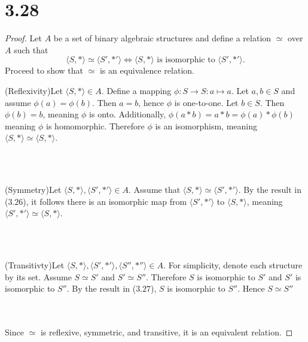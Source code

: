 \documentclass[12pt]{extarticle}
\begin{document}
\section*{3.28}
\begin{proof}
	Let $A$ be a set of binary algebraic structures and define a relation $\simeq$ over $A$ such that
	\[
		\langle S, * \rangle \simeq \langle S', *' \rangle \Longleftrightarrow \langle S, * \rangle\text{ is isomorphic to }\langle S', *' \rangle
	.\]
	Proceed to show that $\simeq$ is an equivalence relation.
	\\

	\qquad\begin{minipage}{\dimexpr\textwidth-2cm}
		(Reflexivity)\quad Let $\langle S, * \rangle \in A$. Define a mapping $\phi : S \to S : a \mapsto a$. Let $a,b \in S$ and assume $\phi(a) = \phi(b)$. Then $a = b$, hence $\phi$ is one-to-one. Let $b \in S$. Then $\phi(b) = b$, meaning $\phi$ is onto. Additionally, $\phi(a * b) = a*b = \phi(a) * \phi(b)$ meaning $\phi$ is homomorphic. Therefore $\phi$ is an isomorphism, meaning $\langle S, * \rangle \simeq \langle S, * \rangle$.
	\end{minipage} \\
  \\

	\qquad\begin{minipage}{\dimexpr\textwidth-2cm}
		(Symmetry)\quad Let $\langle S, * \rangle, \langle S', *' \rangle \in A$. Assume that $\langle S, * \rangle \simeq \langle S', *' \rangle$. By the result in ($3.26$), it follows there is an isomorphic map from $\langle S', *' \rangle$ to $\langle S, * \rangle$, meaning $\langle S', *' \rangle \simeq \langle S, * \rangle$.
	\end{minipage} \\
	\\

	\qquad\begin{minipage}{\dimexpr\textwidth-2cm}
		(Transitivty)\quad Let $\langle S, * \rangle, \langle S', *' \rangle, \langle S'', *'' \rangle \in A$. For simplicity, denote each structure by its set. Assume $S \simeq S'$ and $S' \simeq S''$. Therefore $S$ is isomorphic to $S'$ and $S'$ is isomorphic to $S''$. By the result in ($3.27$), $S$ is isomorphic to $S''$. Hence $S \simeq S''$
	\end{minipage} \\
	\\

	Since $\simeq$ is reflexive, symmetric, and transitive, it is an equivalent relation.
\end{proof}
\end{document}

